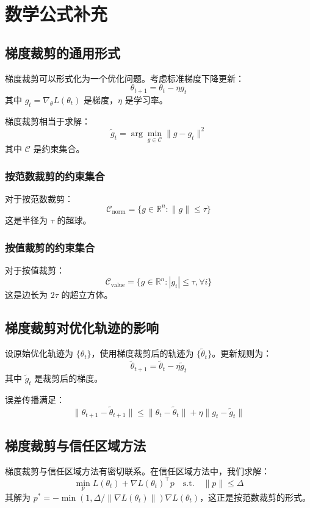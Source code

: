 \documentclass{article}
\begin{document}
\section{数学公式补充}

\subsection{梯度裁剪的通用形式}

梯度裁剪可以形式化为一个优化问题。考虑标准梯度下降更新：
\[
\theta_{t+1} = \theta_t - \eta g_t
\]
其中 $g_t = \nabla_\theta L(\theta_t)$ 是梯度，$\eta$ 是学习率。

梯度裁剪相当于求解：
\[
\tilde{g}_t = \arg\min_{g \in \mathcal{C}} \|g - g_t\|^2
\]
其中 $\mathcal{C}$ 是约束集合。

\subsubsection{按范数裁剪的约束集合}
对于按范数裁剪：
\[
\mathcal{C}_{\text{norm}} = \{ g \in \mathbb{R}^n : \|g\| \leq \tau \}
\]
这是半径为 $\tau$ 的超球。

\subsubsection{按值裁剪的约束集合}
对于按值裁剪：
\[
\mathcal{C}_{\text{value}} = \{ g \in \mathbb{R}^n : |g_i| \leq \tau, \forall i \}
\]
这是边长为 $2\tau$ 的超立方体。

\subsection{梯度裁剪对优化轨迹的影响}

设原始优化轨迹为 $\{\theta_t\}$，使用梯度裁剪后的轨迹为 $\{\tilde{\theta}_t\}$。更新规则为：
\[
\tilde{\theta}_{t+1} = \tilde{\theta}_t - \eta \tilde{g}_t
\]
其中 $\tilde{g}_t$ 是裁剪后的梯度。

误差传播满足：
\[
\|\theta_{t+1} - \tilde{\theta}_{t+1}\| \leq \|\theta_t - \tilde{\theta}_t\| + \eta \|g_t - \tilde{g}_t\|
\]

\subsection{梯度裁剪与信任区域方法}

梯度裁剪与信任区域方法有密切联系。在信任区域方法中，我们求解：
\[
\min_{p} L(\theta_t) + \nabla L(\theta_t)^\top p \quad \text{s.t.} \quad \|p\| \leq \Delta
\]
其解为 $p^* = -\min(1, \Delta/\|\nabla L(\theta_t)\|) \nabla L(\theta_t)$，这正是按范数裁剪的形式。
\end{document}
